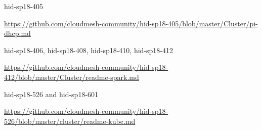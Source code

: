 

\begin{IU}

hid-sp18-405 

\url{https://github.com/cloudmesh-community/hid-sp18-405/blob/master/Cluster/pi-dhcp.md}

\end{IU}




\begin{IU}

hid-sp18-406,  hid-sp18-408, hid-sp18-410, hid-sp18-412

\url{https://github.com/cloudmesh-community/hid-sp18-412/blob/master/Cluster/readme-spark.md }
 
\end{IU}




\begin{IU}

hid-sp18-526 and hid-sp18-601

\url{https://github.com/cloudmesh-community/hid-sp18-526/blob/master/cluster/readme-kube.md}

\end{IU}



